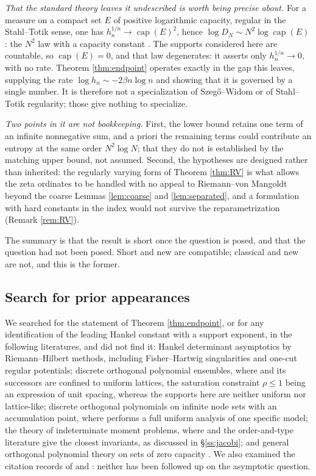 \documentclass[11pt]{amsart}
\numberwithin{equation}{section}
\theoremstyle{plain}
\theoremstyle{definition}
\theoremstyle{remark}
\begin{document}
\emph{That the standard theory leaves it undescribed is worth being precise about.} For a measure on
a compact set $E$ of positive logarithmic capacity, regular in the
Stahl--Totik sense, one has $h_{n}^{1/n}\to\operatorname{cap}(E)^{2}$, hence
$\log D_{N}\sim N^{2}\log\operatorname{cap}(E)$: the $N^{2}$ law with a capacity constant
\cite{StahlTotik1992,Totik2005Orthogonal}. The supports considered here are countable, so
$\operatorname{cap}(E)=0$, and that law degenerates: it asserts only $h_{n}^{1/n}\to0$, with no
rate. Theorem \ref{thm:endpoint} operates exactly in the gap this leaves, supplying the rate
$\log h_{n}\sim-2\beta n\log n$ and showing that it is governed by a single number. It is therefore
not a specialization of Szeg\H o--Widom or of Stahl--Totik regularity; those give nothing to
specialize.

\emph{Two points in it are not bookkeeping.} First, the lower bound retains one term of an infinite
nonnegative sum, and a priori the remaining terms could contribute an entropy at the same order
$N^{2}\log N$; that they do not is established by the matching upper bound, not assumed. Second, the
hypotheses are designed rather than inherited: the regularly varying form of Theorem \ref{thm:RV} is
what allows the zeta ordinates to be handled with no appeal to Riemann--von Mangoldt beyond the
coarse Lemmas \ref{lem:coarse} and \ref{lem:separated}, and a formulation with hard constants in the
index would not survive the reparametrization (Remark \ref{rem:RV}).

The summary is that the result is short once the question is posed, and that the question had not
been posed. Short and new are compatible; classical and new are not, and this is the former.

\subsection{Search for prior appearances}
\label{ss:priorart}

We searched for the statement of Theorem \ref{thm:endpoint}, or for any identification of the
leading Hankel constant with a support exponent, in the following literatures, and did not find it:
Hankel determinant asymptotics by Riemann--Hilbert methods, including Fisher--Hartwig singularities
and one-cut regular potentials; discrete orthogonal polynomial ensembles, where
\cite{Johansson2001} and its successors are confined to uniform lattices, the saturation constraint
$\rho\le1$ being an expression of unit spacing, whereas the supports here are neither uniform nor
lattice-like; discrete orthogonal polynomials on infinite node sets with an accumulation point,
where \cite{WuLinXuZhao2016} performs a full uniform analysis of one specific model; the theory of
indeterminate moment problems, where \cite{BergSzwarc2014} and the order-and-type literature give
the closest invariants, as discussed in \S\ref{ss:jacobi}; and general orthogonal polynomial theory
on sets of zero capacity \cite{StahlTotik1992,Totik2005Orthogonal}. We also examined the citation
records of \cite{Monien2009} and \cite{HaynesZudilin2015}: neither has been followed up on the
asymptotic question.
\end{document}
